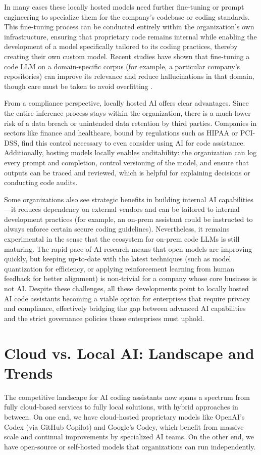 In many cases these locally hosted models need further fine-tuning or prompt engineering to specialize them for the company’s codebase or coding standards. This fine-tuning process can be conducted entirely within the organization’s own infrastructure, ensuring that proprietary code remains internal while enabling the development of a model specifically tailored to its coding practices, thereby creating their own custom model. Recent studies have shown that fine-tuning a code \gls{LLM} on a domain-specific corpus (for example, a particular company’s repositories) can improve its relevance and reduce hallucinations in that domain, though care must be taken to avoid overfitting \autocite{Roziere2023}.

From a compliance perspective, locally hosted \gls{AI} offers clear advantages. Since the entire inference process stays within the organization, there is a much lower risk of a data breach or unintended data retention by third parties. Companies in sectors like finance and healthcare, bound by regulations such as HIPAA or PCI-DSS, find this control necessary to even consider using \gls{AI} for code assistance. Additionally, hosting models locally enables auditability: the organization can log every prompt and completion, control versioning of the model, and ensure that outputs can be traced and reviewed, which is helpful for explaining decisions or conducting code audits.

Some organizations also see strategic benefits in building internal \gls{AI} capabilities—it reduces dependency on external vendors and can be tailored to internal development practices (for example, an on-prem assistant could be instructed to always enforce certain secure coding guidelines). Nevertheless, it remains experimental in the sense that the ecosystem for on-prem code \glspl{LLM} is still maturing. The rapid pace of \gls{AI} research means that open models are improving quickly, but keeping up-to-date with the latest techniques (such as model quantization for efficiency, or applying reinforcement learning from human feedback for better alignment) is non-trivial for a company whose core business is not \gls{AI}. Despite these challenges, all these developments point to locally hosted \gls{AI} code assistants becoming a viable option for enterprises that require privacy and compliance, effectively bridging the gap between advanced \gls{AI} capabilities and the strict governance policies those enterprises must uphold.

\section{Cloud vs. Local AI: Landscape and Trends}
\label{sec:ai-trends}
The competitive landscape for \gls{AI} coding assistants now spans a spectrum from fully cloud-based services to fully local solutions, with hybrid approaches in between. On one end, we have cloud-hosted proprietary models like OpenAI’s Codex (via GitHub Copilot) and Google’s Codey, which benefit from massive scale and continual improvements by specialized \gls{AI} teams. On the other end, we have open-source or self-hosted models that organizations can run independently.

